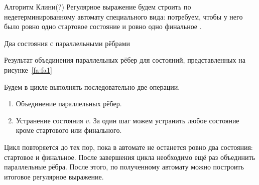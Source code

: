 Алгоритм Клини(?)
Регулярное выражение будем строить по недетерминированному автомату специального вида: потребуем, чтобы у него было ровно одно стартовое состояние и ровно одно финальное%
. 
\begin{marginfigure}    
    \begin{center}
    \end{center}
    \caption{Два состояния с параллельными рёбрами}
    \label{fa:fa1}
\end{marginfigure}
\begin{marginfigure}
    
    \begin{center}
    \end{center}
    \caption{Результат объединения параллельных рёбер для состояний, представленных на рисунке~\ref{fa:fa1}}
    \label{fa:fa2}
\end{marginfigure}

Будем в цикле выполнять последовательно две операции.
\begin{enumerate}
    \item Объединение параллельных рёбер.
    \item Устранение состояния $v$. За один шаг можем устранить любое состояние кроме стартового или финального.
\end{enumerate}
Цикл повторяется до тех пор, пока в автомате не останется ровно два состояния: стартовое и финальное.
После завершения цикла необходимо ещё раз объединить параллельные рёбра. 
После этого, по полученному автомату можно построить итоговое регулярное выражение.

